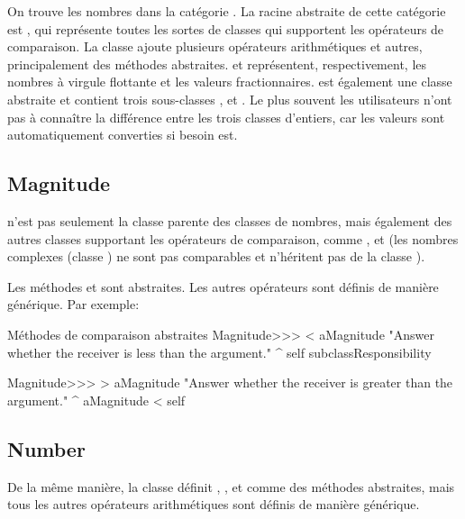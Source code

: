 \documentclass[a4paper,10pt,twoside]{book}
\begin{document}
On trouve les nombres dans la catégorie . La racine abstraite de cette catégorie est , qui représente toutes les sortes de classes qui supportent les opérateurs de comparaison. La classe  ajoute plusieurs opérateurs arithmétiques et autres, principalement des méthodes abstraites.  et  représentent, respectivement, les nombres à virgule flottante et les valeurs fractionnaires.   est également une classe abstraite et contient trois sous-classes ,  et . Le plus souvent les utilisateurs n'ont pas à connaître la différence entre les trois classes d'entiers, car les valeurs sont automatiquement converties si besoin est.

\subsection{Magnitude}

 n'est pas seulement la classe parente des classes de nombres, mais également des autres classes supportant les opérateurs de comparaison, comme ,  et  (les nombres complexes (classe ) ne sont pas comparables et n'héritent pas de la classe ).

Les méthodes  et  sont abstraites. Les autres opérateurs sont définis de manière générique. Par exemple:

\begin{method}{Méthodes de comparaison abstraites}
Magnitude>>> < aMagnitude 
    "Answer whether the receiver is less than the argument."
    ^ self subclassResponsibility

Magnitude>>> > aMagnitude 
    "Answer whether the receiver is greater than the argument."
    ^ aMagnitude < self
\end{method}

\subsection{Number}

De la même manière, la classe  définit , ,  et  comme des méthodes abstraites, mais tous les autres opérateurs arithmétiques sont définis de manière générique.
\end{document}
